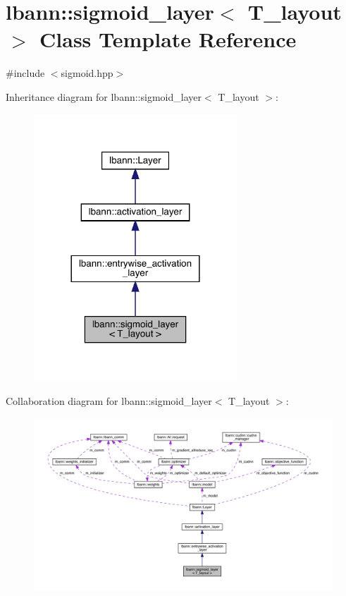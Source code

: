 \hypertarget{classlbann_1_1sigmoid__layer}{}\section{lbann\+:\+:sigmoid\+\_\+layer$<$ T\+\_\+layout $>$ Class Template Reference}
\label{classlbann_1_1sigmoid__layer}


{\ttfamily \#include $<$sigmoid.\+hpp$>$}



Inheritance diagram for lbann\+:\+:sigmoid\+\_\+layer$<$ T\+\_\+layout $>$\+:\nopagebreak
\begin{figure}[H]
\begin{center}
\leavevmode
\includegraphics[width=216pt]{classlbann_1_1sigmoid__layer__inherit__graph}
\end{center}
\end{figure}


Collaboration diagram for lbann\+:\+:sigmoid\+\_\+layer$<$ T\+\_\+layout $>$\+:\nopagebreak
\begin{figure}[H]
\begin{center}
\leavevmode
\includegraphics[width=350pt]{classlbann_1_1sigmoid__layer__coll__graph}
\end{center}
\end{figure}
